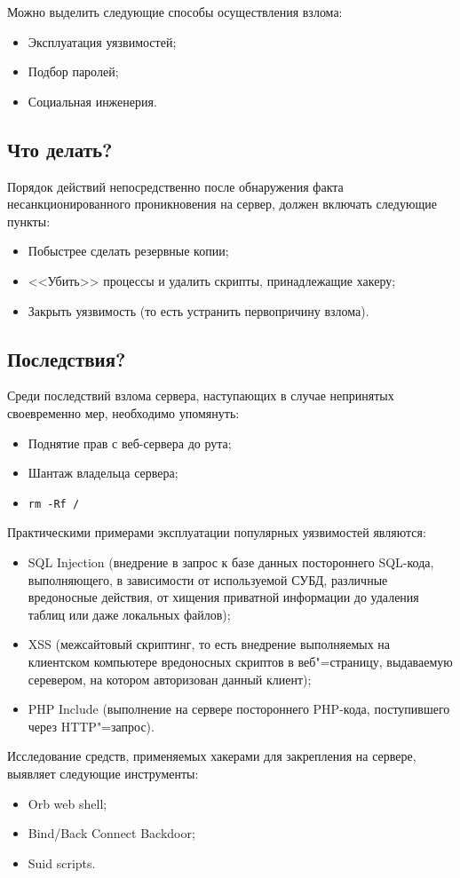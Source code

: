 \documentclass[10pt, a5paper]{article}
\begin{document}
Можно выделить следующие способы осуществления взлома:

\begin{itemize}
  \item Эксплуатация уязвимостей;
  \item Подбор паролей;
  \item Социальная инженерия.
\end{itemize}

\subsection*{Что делать?}

Порядок действий непосредственно после обнаружения факта несанкционированного проникновения на сервер, должен включать следующие пункты:

\begin{itemize}
  \item Побыстрее сделать резервные копии;
  \item <<Убить>> процессы и удалить скрипты, принадлежащие хакеру;
  \item Закрыть уязвимость (то есть устранить первопричину взлома).
\end{itemize}

\subsection*{Последствия?}

Среди последствий взлома сервера, наступающих в случае непринятых своевременно мер, необходимо упомянуть:

\begin{itemize}
  \item Поднятие прав с веб-сервера до рута;
  \item Шантаж владельца сервера;
  \item \verb!rm -Rf /!
\end{itemize}

Практическими примерами эксплуатации популярных уязвимостей являются:

\begin{itemize}
  \item SQL Injection (внедрение в запрос к базе данных постороннего SQL-кода, выполняющего, в зависимости от используемой СУБД, различные вредоносные действия, от хищения приватной информации до удаления таблиц или даже локальных файлов);
  \item XSS (межсайтовый скриптинг, то есть внедрение выполняемых на клиентском компьютере вредоносных скриптов в веб"=страницу, выдаваемую серевером, на котором авторизован данный клиент);
  \item PHP Include (выполнение на сервере постороннего PHP-кода, поступившего через HTTP"=запрос).
\end{itemize}

Исследование средств, применяемых хакерами для закрепления на сервере, выявляет следующие инструменты:

\begin{itemize}
  \item Orb web shell;
  \item Bind/Back Connect Backdoor;
  \item Suid scripts.
\end{itemize}
\end{document}

